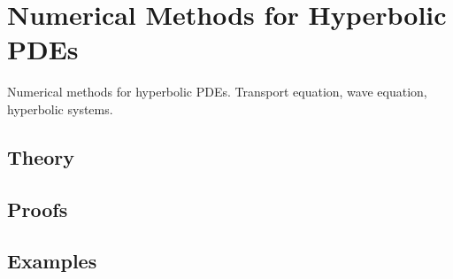 
\section{Numerical Methods for Hyperbolic PDEs}
\label{sec:2.1.13-fd-hyperbolic}

\begin{ticket}
Numerical methods for hyperbolic PDEs. Transport equation, wave equation, hyperbolic systems.
\end{ticket}

\subsection*{Theory}

\subsection*{Proofs}

\subsection*{Examples}
